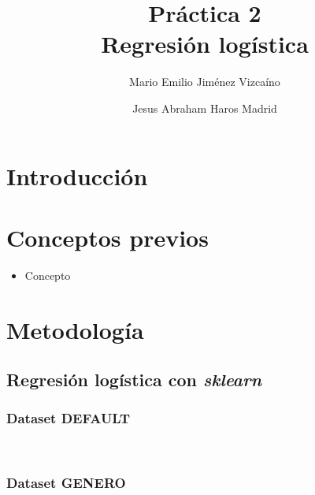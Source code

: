 \documentclass[sigconf,authorversion,nonacm]{acmart}
\begin{document}
\title{Práctica 2 \\ Regresión logística}

\author{Mario Emilio Jiménez Vizcaíno}

\author{Jesus Abraham Haros Madrid}


\begin{abstract}
\end{abstract}

\maketitle

\section{Introducción}


\section{Conceptos previos}
\begin{itemize}
  \item Concepto
\end{itemize}


\section{Metodología}

\subsection{Regresión logística con \textit{sklearn}}

\subsubsection{Dataset DEFAULT}\hfill\\

\subsubsection{Dataset GENERO}\hfill\\
\end{document}
